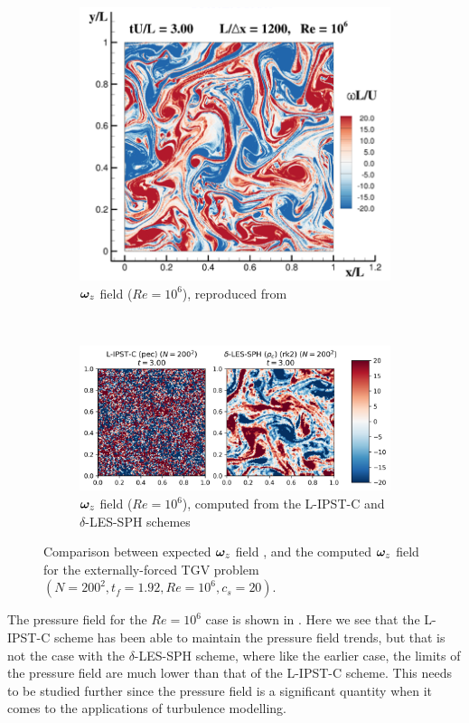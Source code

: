 \begin{figure}[htbp!]
\centering
\begin{subfigure}{10cm}
\centering\includegraphics[width=10cm]{Code-Figures/ext-force-tgv/colag_omegaz_t_3.png}
\caption{$\bm{\omega}_z$ field ($Re = 10^6$), reproduced from \cite{Colagrossi2021QuasiLagrangian}}
\end{subfigure}
\\ \vspace{1cm}
\begin{subfigure}{14cm}
\centering\includegraphics[width=14cm]{Code-Figures/ext-force-tgv/omegaz_t_3.png}
\caption{$\bm{\omega}_z$ field ($Re = 10^6$), computed from the L-IPST-C and $\delta$-LES-SPH schemes}
\end{subfigure}
\caption{Comparison between expected $\bm{\omega}_z$ field \parencite{Colagrossi2021QuasiLagrangian}, and the computed $\bm{\omega}_z$ field for the externally-forced TGV problem $(N=200^2, t_f=1.92, Re=10^6, c_s=20)$.}
\label{fig:tgv-forced-colag-omega}
\end{figure}


The pressure field for the $Re=10^6$ case is shown in .
Here we see that the L-IPST-C scheme has been able to maintain the pressure field trends, but that is not the case with the $\delta$-LES-SPH scheme, where like the earlier case, the limits of the pressure field are much lower than that of the L-IPST-C scheme.
This needs to be studied further since the pressure field is a significant quantity when it comes to the applications of turbulence modelling.

